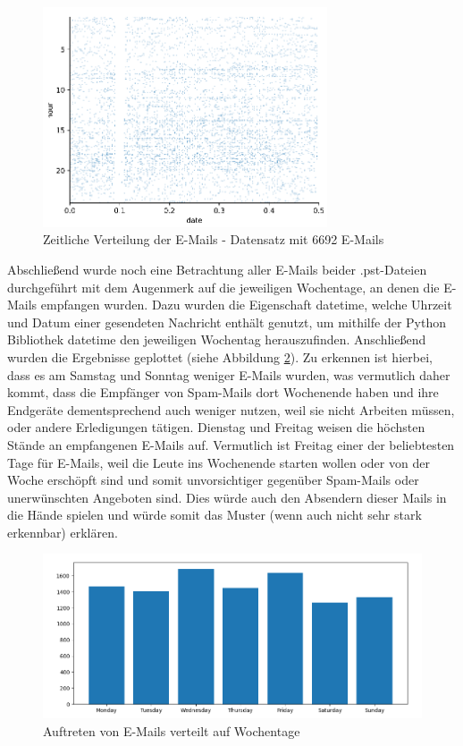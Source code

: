 \begin{figure}[!ht]
    \centering
    \includegraphics[width=0.75\textwidth]{images/merged_plot.PNG}
    \caption{Zeitliche Verteilung der E-Mails - Datensatz mit 6692 E-Mails} 
    \label{fig:auswertungzeitlichmerged}
\end{figure}

\noindent Abschließend wurde noch eine Betrachtung aller E-Mails beider .pst-Dateien durchgeführt mit dem Augenmerk auf die jeweiligen Wochentage, an denen die E-Mails empfangen wurden. Dazu wurden die Eigenschaft \glqq{}datetime\grqq{}, welche Uhrzeit und Datum einer gesendeten Nachricht enthält genutzt, um mithilfe der Python Bibliothek datetime den jeweiligen Wochentag herauszufinden. Anschließend wurden die Ergebnisse geplottet (siehe Abbildung \ref{fig:plotweekdays}). Zu erkennen ist hierbei, dass es am Samstag und Sonntag weniger E-Mails wurden, was vermutlich daher kommt, dass die Empfänger von Spam-Mails dort Wochenende haben und ihre Endgeräte dementsprechend auch weniger nutzen, weil sie nicht Arbeiten müssen, oder andere Erledigungen tätigen. Dienstag und Freitag weisen die höchsten Stände an empfangenen E-Mails auf. Vermutlich ist Freitag einer der beliebtesten Tage für E-Mails, weil die Leute ins Wochenende starten wollen oder von der Woche erschöpft sind und somit unvorsichtiger gegenüber Spam-Mails oder unerwünschten Angeboten sind. Dies würde auch den Absendern dieser Mails in die Hände spielen und würde somit das Muster (wenn auch nicht sehr stark erkennbar) erklären.

\begin{figure}[!ht]
    \centering
    \includegraphics[width=1\textwidth]{images/received_mails_per_weekday.PNG}
    \caption{Auftreten von E-Mails verteilt auf Wochentage} 
    \label{fig:plotweekdays}
\end{figure}
